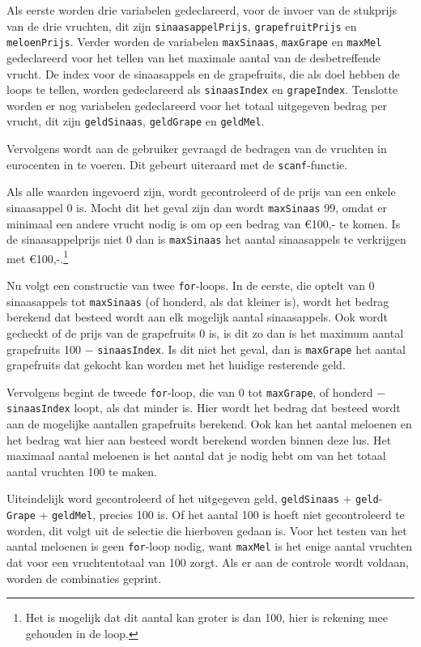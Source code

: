 Als eerste worden drie variabelen gedeclareerd, voor de invoer van de stukprijs van de drie vruchten, dit zijn {\tt sinaasappelPrijs}, {\tt grapefruitPrijs} en {\tt meloenPrijs}.
Verder worden de variabelen {\tt maxSinaas}, {\tt maxGrape} en {\tt maxMel} gedeclareerd voor het tellen van het maximale aantal van de desbetreffende vrucht.
De index voor de sinaasappels en de grapefruits, die als doel hebben de loops te tellen, worden gedeclareerd als {\tt sinaasIndex} en {\tt grapeIndex}.
Tenslotte worden er nog variabelen gedeclareerd voor het totaal uitgegeven bedrag per vrucht, dit zijn {\tt geldSinaas}, {\tt geldGrape} en {\tt geldMel}.

Vervolgens wordt aan de gebruiker gevraagd de bedragen van de vruchten in eurocenten in te voeren.
Dit gebeurt uiteraard met de {\tt scanf}-functie.

Als alle waarden ingevoerd zijn, wordt gecontroleerd of de prijs van een enkele sinaasappel 0 is.
Mocht dit het geval zijn dan wordt {\tt maxSinaas} 99, omdat er minimaal een andere vrucht nodig is om op een bedrag van \euro100,- te komen.
Is de sinaasappelprijs niet 0 dan is {\tt maxSinaas} het aantal sinaasappels te verkrijgen met \euro100,-.\footnote{Het is mogelijk dat dit aantal kan groter is dan 100, hier is rekening mee gehouden in de loop.}

Nu volgt een constructie van twee {\tt for}-loops.
In de eerste, die optelt van 0 sinaasappels tot {\tt maxSinaas} (of honderd, als dat kleiner is), wordt het bedrag berekend dat besteed wordt aan elk mogelijk aantal sinaasappels.
Ook wordt gecheckt of de prijs van de grapefruits 0 is, is dit zo dan is het maximum aantal grapefruits 100 $-$ {\tt sinaasIndex}.
Is dit niet het geval, dan is {\tt maxGrape} het aantal grapefruits dat gekocht kan worden met het huidige resterende geld.

Vervolgens begint de tweede {\tt for}-loop, die van 0 tot {\tt maxGrape}, of honderd $-$ {\tt sinaasIndex} loopt, als dat minder is. Hier wordt het bedrag dat besteed wordt aan de mogelijke aantallen grapefruits berekend.
Ook kan het aantal meloenen en het bedrag wat hier aan besteed wordt berekend worden binnen deze lus.
Het maximaal aantal meloenen is het aantal dat je nodig hebt om van het totaal aantal vruchten 100 te maken.

Uiteindelijk word gecontroleerd of het uitgegeven geld, {\tt geldSinaas} + {\tt geld}-\\{\tt Grape} + {\tt geldMel}, precies 100 is.
Of het aantal 100 is hoeft niet gecontroleerd te worden, dit volgt uit de selectie die hierboven gedaan is.
Voor het testen van het aantal meloenen is geen {\tt for}-loop nodig, want {\tt maxMel} is het enige aantal vruchten dat voor een vruchtentotaal van 100 zorgt.
Als er aan de controle wordt voldaan, worden de combinaties geprint.

